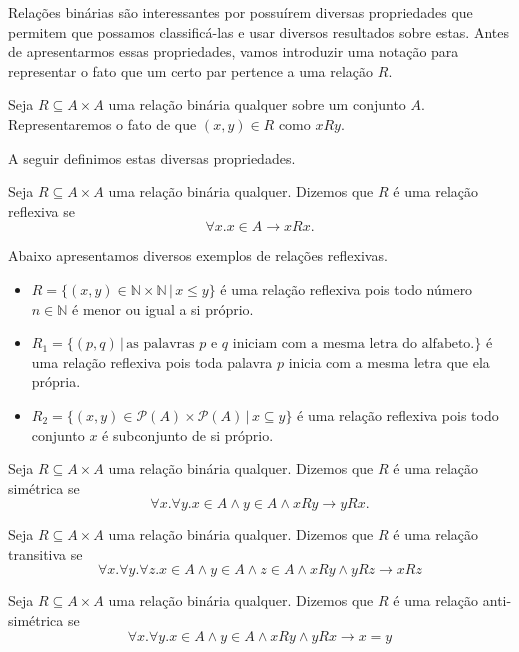 Relações binárias são interessantes por possuírem diversas
propriedades que permitem que possamos classificá-las e usar diversos
resultados sobre estas. Antes de apresentarmos essas propriedades,
vamos introduzir uma notação para representar o fato que um certo par
pertence a uma relação $R$.
\begin{Notation}
Seja $R\subseteq A \times A$ uma relação binária qualquer sobre um
conjunto $A$. Representaremos o fato de que $(x,y) \in R$ como $xRy$.
\end{Notation}
A seguir definimos estas diversas
propriedades.

\begin{Definition}
Seja $R\subseteq A \times A$ uma relação binária qualquer. Dizemos que
$R$ é uma relação reflexiva se
\[
\forall x. x\in A \to  xRx.
\]
\end{Definition}

\begin{Example}
Abaixo apresentamos diversos exemplos de relações reflexivas.
\begin{itemize}
  \item $R = \{(x,y) \in \mathbb{N} \times \mathbb{N}\,|\, x \leq
    y\}$ é uma relação reflexiva pois todo número $n\in\mathbb{N}$ é
    menor ou igual a si próprio.
  \item $R_1 = \{(p,q)\,|\,\text{as palavras $p$ e $q$ iniciam com a
      mesma letra do alfabeto.}\}$ é uma relação reflexiva pois toda
    palavra $p$ inicia com a mesma letra que ela própria.
  \item $R_2=\{(x,y)\in\mathcal{P}(A)\times\mathcal{P}(A)\,|\,x
    \subseteq y\}$ é uma relação reflexiva pois todo conjunto $x$ é
    subconjunto de si próprio.
\end{itemize}
\end{Example}

\begin{Definition}
Seja $R\subseteq A \times A$ uma relação binária qualquer. Dizemos que
$R$ é uma relação simétrica se
\[\forall x.\forall y. x \in A \land y\in A \land x R y \to y R x. \]
\end{Definition}

\begin{Definition}
Seja $R\subseteq A \times A$ uma relação binária qualquer. Dizemos que
$R$ é uma relação transitiva se
\[
\forall x.\forall y. \forall z. x \in A \land y \in A \land z \in A
\land xRy \land yRz \to xRz
\]
\end{Definition}

\begin{Definition}
Seja $R\subseteq A \times A$ uma relação binária qualquer. Dizemos que
$R$ é uma relação anti-simétrica se
\[
\forall x.\forall y.  x \in A \land y \in A
\land xRy \land yRx \to x = y
\]
\end{Definition}